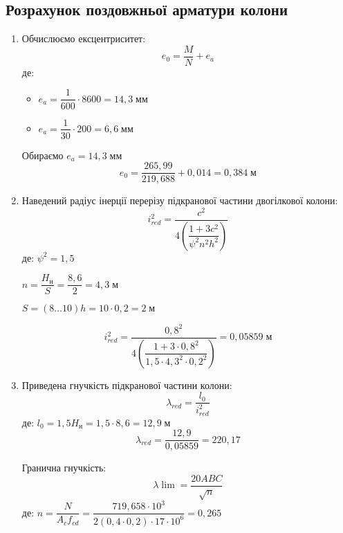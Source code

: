 \documentclass[a4paper,14pt]{article}
\begin{document}
\subsection{Розрахунок поздовжньої арматури колони}

\begin{enumerate}
    \item Обчислюємо ексцентриситет:
        \begin{equation}\label{eq:e_0}
            e_0 = \dfrac{M}{N}+e_a
        \end{equation}
        де: \begin{itemize}
                \item $e_a = \dfrac{1}{600} \cdot 8600 = 14,3\;\textit{мм}$
                \item $e_a = \dfrac{1}{30} \cdot 200 = 6,6\;\textit{мм}$
            \end{itemize}
        Обираємо $e_a = 14,3\;\textit{мм}$
        $$e_0 = \dfrac{265,99}{219,688}+0,014 = 0,384\;\textit{м}$$
    \item Наведений радіус інерції перерізу підкранової частини двогілкової колони:
        \begin{equation}
            i_{red}^2 = \dfrac{c^2}{4 \left(\dfrac{1+3c^2}{\psi^2n^2h^2}\right)}
        \end{equation}
        де: $\psi^2 = 1,5$

                $n = \dfrac{H_\textit{н}}{S} = \dfrac{8,6}{2} = 4,3\;\textit{м}$

                $S = (8 \ldots 10)h = 10 \cdot 0,2 = 2\;\textit{м}$
           
        $$i_{red}^2 = \dfrac{0,8^2}{4 \left(\dfrac{1+3 \cdot 0,8^2}{1,5 \cdot 4,3^2 \cdot 0,2^2}\right)} = 0,05859\;\textit{м}$$
    \item Приведена гнучкість підкранової частини колони:
        \begin{equation}
            \lambda_{red} = \dfrac{l_0}{i_{red}^2}
        \end{equation}
        де: $l_0 = 1,5H_\textit{н} = 1,5 \cdot 8,6 = 12,9\;\textit{м}$
        $$\lambda_{red} = \dfrac{12,9}{0,05859} = 220,17$$
        
        Гранична гнучкість:
        \begin{equation}
            \lambda \lim = \dfrac{20ABC}{\sqrt{n}}
        \end{equation}
        де: $n = \dfrac{N}{A_cf_{cd}} = \dfrac{719,658 \cdot 10^3}{2(0,4 \cdot 0,2) \cdot 17 \cdot 10^6} = 0,265$


\end{enumerate}
\end{document}
